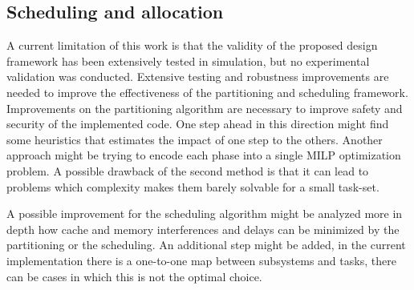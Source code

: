 \subsection{Scheduling and allocation}
A current limitation of this work is that the validity of the proposed design framework has been extensively tested in simulation, but no experimental validation was conducted. Extensive testing and robustness improvements are needed to improve the effectiveness of the partitioning and scheduling framework. Improvements on the partitioning algorithm are necessary to improve safety and security of the implemented code. One step ahead in this direction might find some heuristics that estimates the impact of one step to the others. Another approach might be trying to encode each phase into a single MILP optimization problem. A possible drawback of the second method is that it can lead to problems which complexity makes them barely solvable for a small task-set. 
\par A possible improvement for the scheduling algorithm might be analyzed more in depth how cache and memory interferences and delays can be minimized by the partitioning or the scheduling. An additional step might be added, in the current implementation there is a one-to-one map between subsystems and tasks, there can be cases in which this is not the optimal choice.

